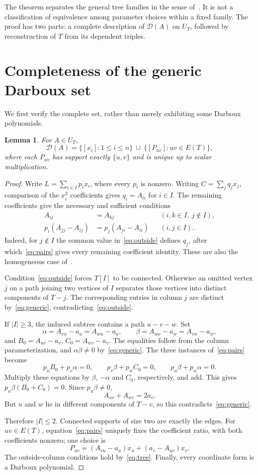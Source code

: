 \documentclass{amsart}
\newtheorem{lemma}[theorem]{Lemma}
\theoremstyle{remark}
\newcommand{\DD}{\mathcal D}
\numberwithin{equation}{section}
\begin{document}
The theorem separates the general tree families in the sense of~\cite{hypergraphs}. It is not a classification of equivalence among parameter choices within a fixed family. The proof has two parts: a complete description of $\DD(A)$ on $U_T$, followed by reconstruction of $T$ from its dependent triples.

\section{Completeness of the generic Darboux set}
We first verify the complete set, rather than merely exhibiting some Darboux polynomials.

\begin{lemma}\label{lem:complete}
For $A\in U_T$,
\[
 \DD(A)=\{[x_i]:1\le i\le n\}\ \cup\
 \{[P_{uv}]:uv\in E(T)\},
\]
where each $P_{uv}$ has support exactly $\{u,v\}$ and is unique up to scalar multiplication.
\end{lemma}
\begin{proof}
Write $L=\sum_{i\in I}p_ix_i$, where every $p_i$ is nonzero.
Writing $C=\sum_j q_jx_j$, comparison of the $x_i^2$ coefficients gives $q_i=A_{ii}$ for $i\in I$. The remaining coefficients give the necessary and sufficient conditions
\begin{align}
 A_{ij}&=A_{kj} &&(i,k\in I,\ j\notin I),\label{eq:outside}\\
 p_i(A_{jj}-A_{ij})&=p_j(A_{ji}-A_{ii}) &&(i,j\in I).\label{eq:pairs}
\end{align}
Indeed, for $j\notin I$ the common value in~\eqref{eq:outside} defines $q_j$, after which~\eqref{eq:pairs} gives every remaining coefficient identity. These are also the homogeneous case of~\cite[Lemma~2]{hypergraphs}.

Condition~\eqref{eq:outside} forces $T[I]$ to be connected. Otherwise an omitted vertex $j$ on a path joining two vertices of $I$ separates those vertices into distinct components of $T-j$. The corresponding entries in column $j$ are distinct by~\eqref{eq:generic}, contradicting~\eqref{eq:outside}.

If $|I|\ge3$, the induced subtree contains a path $u-v-w$. Set
\[
 \alpha=A_{vu}-a_u=A_{wu}-a_u,\qquad
 \beta=A_{uw}-a_w=A_{vw}-a_w,
\]
and $B_0=A_{uv}-a_v$, $C_0=A_{wv}-a_v$.
The equalities follow from the column parameterization, and $\alpha\beta\ne0$ by~\eqref{eq:generic}.
The three instances of~\eqref{eq:pairs} become
\[
 p_uB_0+p_v\alpha=0,\qquad
 p_v\beta+p_wC_0=0,\qquad
 p_u\beta+p_w\alpha=0.
\]
Multiply these equations by $\beta$, $-\alpha$ and $C_0$, respectively, and add. This gives $p_u\beta(B_0+C_0)=0$. Since $p_u\beta\ne0$,
\[
 A_{uv}+A_{wv}=2a_v.
\]
But $u$ and $w$ lie in different components of $T-v$, so this contradicts~\eqref{eq:generic}.

Therefore $|I|\le2$. Connected supports of size two are exactly the edges. For $uv\in E(T)$, equation~\eqref{eq:pairs} uniquely fixes the coefficient ratio, with both coefficients nonzero; one choice is
\[
 P_{uv}=(A_{vu}-a_u)x_u+(a_v-A_{uv})x_v.
\]
The outside-column conditions hold by~\eqref{eq:tree}. Finally, every coordinate form is a Darboux polynomial.
\end{proof}
\end{document}
